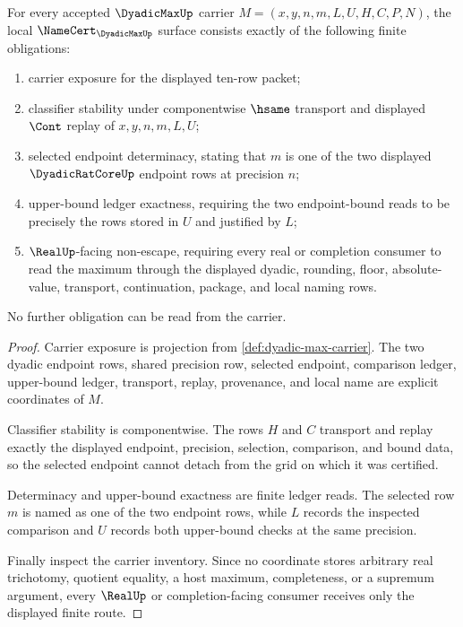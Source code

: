 \begin{theorem}
\label{thm:dyadic-max-namecert-obligations}
For every accepted $\DyadicMaxUp$ carrier $M=(x,y,n,m,L,U,H,C,P,N)$, the local $\NameCert_{\DyadicMaxUp}$ surface consists exactly of the following finite obligations:
\begin{enumerate}
\item carrier exposure for the displayed ten-row packet;
\item classifier stability under componentwise $\hsame$ transport and displayed $\Cont$ replay of $x,y,n,m,L,U$;
\item selected endpoint determinacy, stating that $m$ is one of the two displayed $\DyadicRatCoreUp$ endpoint rows at precision $n$;
\item upper-bound ledger exactness, requiring the two endpoint-bound reads to be precisely the rows stored in $U$ and justified by $L$;
\item $\RealUp$-facing non-escape, requiring every real or completion consumer to read the maximum through the displayed dyadic, rounding, floor, absolute-value, transport, continuation, package, and local naming rows.
\end{enumerate}
No further obligation can be read from the carrier.
\end{theorem}
\begin{proof}
Carrier exposure is projection from \autoref{def:dyadic-max-carrier}. The two dyadic endpoint rows, shared precision row, selected endpoint, comparison ledger, upper-bound ledger, transport, replay, provenance, and local name are explicit coordinates of $M$.

Classifier stability is componentwise. The rows $H$ and $C$ transport and replay exactly the displayed endpoint, precision, selection, comparison, and bound data, so the selected endpoint cannot detach from the grid on which it was certified.

Determinacy and upper-bound exactness are finite ledger reads. The selected row $m$ is named as one of the two endpoint rows, while $L$ records the inspected comparison and $U$ records both upper-bound checks at the same precision.

Finally inspect the carrier inventory. Since no coordinate stores arbitrary real trichotomy, quotient equality, a host maximum, completeness, or a supremum argument, every $\RealUp$ or completion-facing consumer receives only the displayed finite route.
\end{proof}

